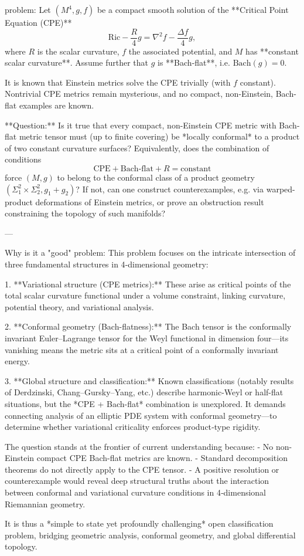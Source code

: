 problem:  
Let \( (M^4,g,f) \) be a compact smooth solution of the **Critical Point Equation (CPE)**  
\[
\mathrm{Ric} - \frac{R}{4} g = \nabla^2 f - \frac{\Delta f}{4} g,
\]
where \(R\) is the scalar curvature, \(f\) the associated potential, and \(M\) has **constant scalar curvature**.  
Assume further that \(g\) is **Bach-flat**, i.e. \( \mathrm{Bach}(g)=0\).  

It is known that Einstein metrics solve the CPE trivially (with \(f\) constant). Nontrivial CPE metrics remain mysterious, and no compact, non-Einstein, Bach-flat examples are known.

**Question:**  
Is it true that every compact, non-Einstein CPE metric with Bach-flat metric tensor must (up to finite covering) be *locally conformal* to a product of two constant curvature surfaces?  
Equivalently, does the combination of conditions  
\[
\text{CPE} + \text{Bach-flat} + R = \text{constant}
\]
force \( (M,g) \) to belong to the conformal class of a product geometry \( (\Sigma_1^2 \times \Sigma_2^2, g_1 + g_2) \)?  
If not, can one construct counterexamples, e.g. via warped-product deformations of Einstein metrics, or prove an obstruction result constraining the topology of such manifolds?

---

Why is it a "good" problem:  
This problem focuses on the intricate intersection of three fundamental structures in 4‑dimensional geometry:  

1. **Variational structure (CPE metrics):** These arise as critical points of the total scalar curvature functional under a volume constraint, linking curvature, potential theory, and variational analysis.  

2. **Conformal geometry (Bach-flatness):** The Bach tensor is the conformally invariant Euler–Lagrange tensor for the Weyl functional in dimension four—its vanishing means the metric sits at a critical point of a conformally invariant energy.  

3. **Global structure and classification:** Known classifications (notably results of Derdzinski, Chang–Gursky–Yang, etc.) describe harmonic-Weyl or half-flat situations, but the *CPE + Bach-flat* combination is unexplored. It demands connecting analysis of an elliptic PDE system with conformal geometry—to determine whether variational criticality enforces product‑type rigidity.  

The question stands at the frontier of current understanding because:  
- No non-Einstein compact CPE Bach-flat metrics are known.  
- Standard decomposition theorems do not directly apply to the CPE tensor.  
- A positive resolution or counterexample would reveal deep structural truths about the interaction between conformal and variational curvature conditions in 4‑dimensional Riemannian geometry.  

It is thus a *simple to state yet profoundly challenging* open classification problem, bridging geometric analysis, conformal geometry, and global differential topology.